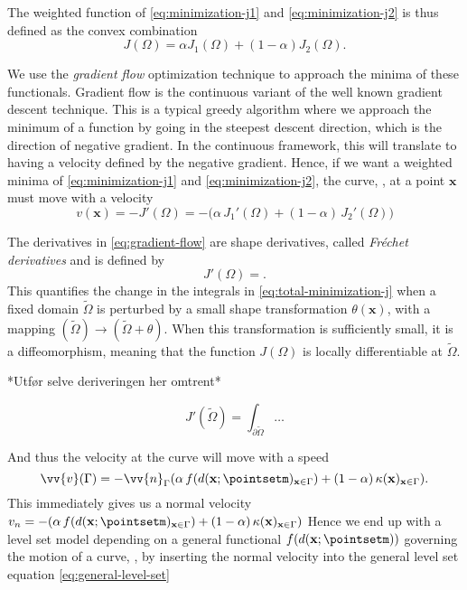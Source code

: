 The weighted function of \eqref{eq:minimization-j1} and \eqref{eq:minimization-j2} is thus defined as the convex combination
\begin{equation}
    J(\Omega) = \alpha J_1(\Omega) + (1-\alpha) J_2(\Omega).
    \label{eq:total-minimization-j}
\end{equation}

We use the \textit{gradient flow} optimization technique to approach the minima of these functionals. Gradient flow is the continuous variant of the well known gradient descent technique. This is a typical greedy algorithm where we approach the minimum of a function by going in the steepest descent direction, which is the direction of negative gradient. In the continuous framework, this will translate to having a velocity defined by the negative gradient. Hence, if we want a weighted minima of \eqref{eq:minimization-j1} and \eqref{eq:minimization-j2}, the curve, \curve, at a point $\mathbf{x}$ must move with a velocity
\begin{equation}
    v(\mathbf{x}) = - J'(\Omega) = -\big(\alpha \, J_1'(\Omega) + (1-\alpha)\, J_2' (\Omega) \big)
    \label{eq:gradient-flow}
\end{equation}

The derivatives in \eqref{eq:gradient-flow} are shape derivatives, called \textit{Fréchet derivatives} and is defined by 
\begin{equation*}
    J'(\Omega) =     .
\end{equation*}
This quantifies the change in the integrals in \eqref{eq:total-minimization-j} when a fixed domain $\tilde{\Omega}$ is perturbed by a small shape transformation $\theta(\mathbf{x})$, with a mapping $(\tilde{\Omega})\to (\tilde{\Omega} + \theta)$. When this transformation is sufficiently small, it is a diffeomorphism, meaning that the function $J(\Omega)$ is locally differentiable at $\tilde{\Omega}$.  

*Utfør selve deriveringen her omtrent*

\begin{equation}
    J'(\tilde{\Omega}) = \int_{\partial \tilde{\Omega}} \dots
    \label{eq:gradient-velocity}
\end{equation}

And thus the velocity at the curve will move with a speed 
\begin{equation}
    \vv{v}(\Gamma) = -\vv{n}_{\Gamma} (\alpha \, f(d(\mathbf{x};\pointsetm)_{\mathbf{x}\in \Gamma}) + (1-\alpha)\, \kappa(\mathbf{x})_{\mathbf{x}\in \Gamma}).
\end{equation}
This immediately gives us a normal velocity $v_n = -(\alpha \, f(d(\mathbf{x};\pointsetm)_{\mathbf{x}\in \Gamma}) + (1-\alpha)\, \kappa(\mathbf{x})_{\mathbf{x}\in \Gamma})$
Hence we end up with a level set model depending on a general functional $f(d(\mathbf{x}; \pointsetm))$ governing the motion of a curve, \curve, by inserting the normal velocity into the general level set equation \eqref{eq:general-level-set}

